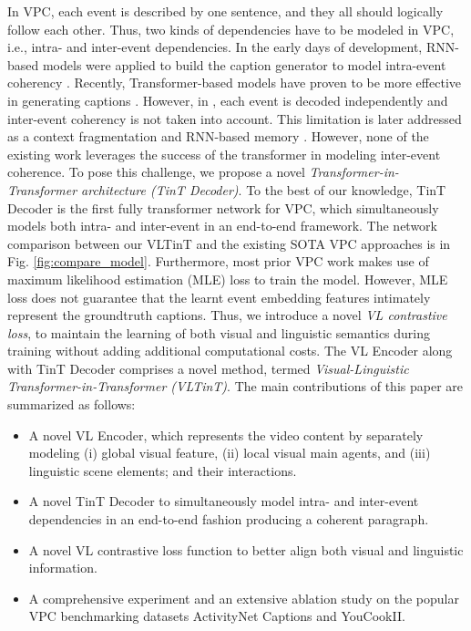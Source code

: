 \documentclass[letterpaper]{article} \usepackage{aaai23}  \usepackage{times}  \usepackage{helvet}  \usepackage{courier}  \usepackage[hyphens]{url}  \usepackage{graphicx} \urlstyle{rm} \def\UrlFont{\rm}  \usepackage{natbib}  \usepackage{caption} \frenchspacing  \setlength{\pdfpagewidth}{8.5in}  \setlength{\pdfpageheight}{11in}  \usepackage{algorithm}
\newcommand{\encoder}{VL Encoder\xspace}
\begin{document}
In VPC, each event is described by one sentence, and they all should logically follow each other. Thus, two kinds of dependencies have to be modeled in VPC, i.e., intra- and inter-event dependencies. In the early days of development, RNN-based models were applied to build the caption generator to model intra-event coherency \cite{xiong2018move, park2019adversarial}. Recently, Transformer-based models have proven to be more effective in generating captions \cite{dai2019transformer, lei2020mart, ging2020coot}. However, in \cite{zhou2018end}, each event is decoded independently and inter-event coherency is not taken into account. This limitation is later addressed as a context fragmentation \cite{dai2019transformer} and RNN-based memory \cite{lei2020mart, ging2020coot}. However, none of the existing work leverages the success of the transformer in modeling  inter-event coherence.
To pose this challenge, we propose a novel \emph{Transformer-in-Transformer architecture (TinT Decoder)}. To the best of our knowledge, TinT Decoder is the first fully transformer network for VPC, which simultaneously models both intra- and inter-event in an end-to-end framework. The network comparison between our VLTinT and the existing SOTA VPC approaches is in Fig. \ref{fig:compare_model}. Furthermore, most prior VPC work makes use of maximum likelihood estimation (MLE) loss to train the model.
However, MLE loss does not guarantee that the learnt event embedding features intimately represent the groundtruth captions. Thus, we introduce a novel \emph{VL contrastive loss}, to maintain the learning of both visual and linguistic semantics during training without adding additional computational costs.
The \encoder along with TinT Decoder comprises a novel method, termed \emph{Visual-Linguistic Transformer-in-Transformer (VLTinT)}. The main contributions of this paper are summarized as follows:

\begin{itemize} [noitemsep,topsep=0pt]
\item A novel \encoder, which represents the video content by separately modeling (i) global visual feature, (ii) local visual main agents, and (iii) linguistic scene elements; and their interactions.
\item A novel TinT Decoder to simultaneously model intra- and inter-event dependencies in an end-to-end fashion producing a coherent paragraph. 
\item A novel VL contrastive loss function to better align both visual and linguistic information. 
\item A comprehensive experiment and an extensive ablation study on the popular VPC benchmarking datasets ActivityNet Captions and YouCookII.
\end{itemize}
\end{document}
